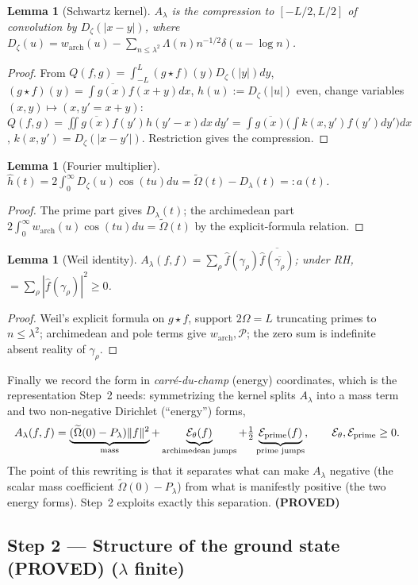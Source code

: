 \documentclass[11pt]{amsart}
\newtheorem{lemma}[theorem]{Lemma}
\theoremstyle{definition}
\theoremstyle{remark}
\newcommand{\Om}{\widetilde{\Omega}}
\newcommand{\PROVED}{\textbf{(PROVED)}}
\begin{document}
\begin{lemma}[Schwartz kernel]
$A_\lambda$ is the compression to $[-L/2,L/2]$ of convolution by $D_\zeta(|x-y|)$, where
$D_\zeta(u)=w_{\mathrm{arch}}(u)-\sum_{n\le\lambda^2}\Lambda(n)n^{-1/2}\delta(u-\log n)$.
\end{lemma}
\begin{proof}
From $Q(f,g)=\int_{-L}^{L}(g\star f)(y)D_\zeta(|y|)dy$, $(g\star f)(y)=\int\overline{g(x)}f(x+y)dx$,
$h(u):=D_\zeta(|u|)$ even, change variables $(x,y)\mapsto(x,y'{=}x{+}y)$:
$Q(f,g)=\iint\overline{g(x)}f(y')h(y'-x)dx\,dy'=\int\overline{g(x)}\big(\int k(x,y')f(y')dy'\big)dx$,
$k(x,y')=D_\zeta(|x-y'|)$. Restriction gives the compression.
\end{proof}
\begin{lemma}[Fourier multiplier]
$\hat h(t)=2\int_0^\infty D_\zeta(u)\cos(tu)du=\Om(t)-D_\lambda(t)=:a(t)$.
\end{lemma}
\begin{proof}
The prime part gives $D_\lambda(t)$; the archimedean part
$2\int_0^\infty w_{\mathrm{arch}}(u)\cos(tu)du=\Om(t)$ by the explicit-formula relation.
\end{proof}
\begin{lemma}[Weil identity]\label{weil}
$A_\lambda(f,f)=\sum_\rho\hat f(\gamma_\rho)\overline{\hat f(\overline{\gamma_\rho})}$; under RH,
$=\sum_\rho|\hat f(\gamma_\rho)|^2\ge0$.
\end{lemma}
\begin{proof}
Weil's explicit formula on $g\star f$, support $2\Omega=L$ truncating primes to $n\le\lambda^2$;
archimedean and pole terms give $w_{\mathrm{arch}},\mathcal P$; the zero sum is indefinite absent
reality of $\gamma_\rho$.
\end{proof}
Finally we record the form in \emph{carr\'e-du-champ} (energy) coordinates, which is the
representation Step~2 needs: symmetrizing the kernel splits $A_\lambda$ into a mass term and two
non-negative Dirichlet (``energy'') forms,
\[
A_\lambda(f,f)=\underbrace{(\Om(0)-P_\lambda)\|f\|^2}_{\text{mass}}
+\underbrace{\mathcal E_\theta(f)}_{\text{archimedean jumps}}
+\tfrac12\underbrace{\mathcal E_{\rm prime}(f)}_{\text{prime jumps}},\qquad
\mathcal E_\theta,\mathcal E_{\rm prime}\ge0 .
\]
The point of this rewriting is that it separates what can make $A_\lambda$ negative (the scalar
mass coefficient $\Om(0)-P_\lambda$) from what is manifestly positive (the two energy forms).
Step~2 exploits exactly this separation. \PROVED

\subsection{Step 2 --- Structure of the ground state \PROVED{} ($\lambda$ finite)}
\end{document}
